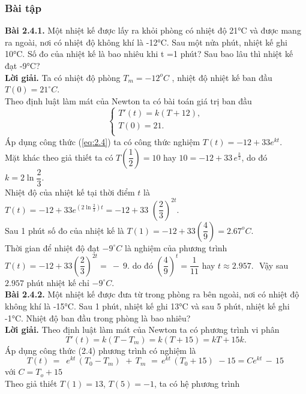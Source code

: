 \subsubsection{Bài tập}
\noindent\textbf{Bài 2.4.1. } Một nhiệt kế được lấy ra khỏi phòng có nhiệt độ 21°C và được mang ra ngoài, nơi có nhiệt độ không khí là -12°C. Sau một nửa phút, nhiệt kế ghi 10°C. Số đo của nhiệt kế là bao nhiêu khi t =1 phút? Sau bao lâu thì nhiệt kế đạt -9°C?\\
\textbf{Lời giải. }
Ta có nhiệt độ phòng  ${{T}_{m}}=-{{12}^{o}}C$ , nhiệt độ nhiệt kế ban đầu $T(0)=21^{\circ}C$.\\
Theo định luật làm mát của Newton ta có bài toán giá trị ban đầu 
$$\left\{ \begin{array}{l}
	 {T}'(t)=k\left( T+12 \right), \\ 
	 T(0)=21. \\ 
\end{array} \right.$$
Áp dụng công thức (\ref{eq:2.4}) ta có công thức nghiệm $T(t)=-12+33{{e}^{kt}}.$\\
Mặt khác theo giả thiết ta có $T(\dfrac{1}{2})=10$ hay $ 10=-12+33\,{{e}^{\frac{k}{2}}}$, do đó $k=2\ln \dfrac{2}{3}.$\\
Nhiệt độ của nhiệt kế tại thời điểm $t$ là $T(t)=-12+33{{e}^{\left( 2\ln \frac{2}{3} \right)t}}=-12+33\,\,{{\left( \dfrac{2}{3} \right)}^{2t}}.$\\
Sau 1 phút số đo của nhiệt kế là $T(1)=-12+33(\dfrac{4}{9})={{2.67}^{o}}C.$\\
Thời gian để nhiệt độ đạt $-9^{\circ}C$ là nghiệm của phương trình  $T(t)=-12+33{{(\dfrac{2}{3})}^{2t}}=~-~9.$ do đó ${{\left( \dfrac{4}{9} \right)}^{t}}=\dfrac{1}{11}$ hay $t\approx 2.957.\,\,$ Vậy sau $2.957 $ phút nhiệt kế chỉ $-9^{\circ}C.$\\
\textbf{Bài 2.4.2.} Một nhiệt kế được đưa từ trong phòng ra bên ngoài, nơi có nhiệt độ không khí là -15°C. Sau 1 phút, nhiệt kế ghi 13°C và sau 5 phút, nhiệt kế ghi -1°C. Nhiệt độ ban đầu trong phòng là bao nhiêu?\\
\noindent\textbf{Lời giải.}
Theo định luật làm mát của Newton ta có phương trình vi phân
$$T'(t)=k(T-{{T}_{m}})=k(T+15)=kT+15k.$$
Áp dụng công thức (2.4) phương trình có nghiệm là 
$$T(t)\,=\,\,\,{{e}^{kt}}\,({{T}_{0}}-{{T}_{m}})\,\,+\,{{T}_{m}}\,\,=\,{{e}^{kt}}\,({{T}_{0}}+15)\,\,-15=C{{e}^{kt}}\,-\,15\,$$ với $C={{T}_{o}}+15$\\
Theo giả thiết $T(1)=13$, $T\left( 5 \right)=-1$, ta có hệ phương trình

